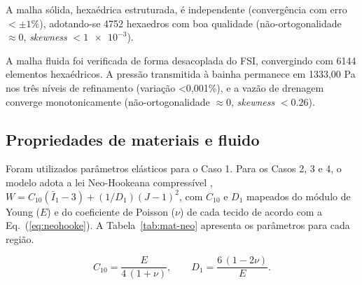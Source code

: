 \documentclass[article, hidelinks,oneside,12pt]{abntex2}
\begin{document}
A malha sólida, hexaédrica estruturada, é independente (convergência com erro $< \pm 1\%$), adotando-se \num{4752} hexaedros com boa qualidade (não-ortogonalidade $\approx 0$, \emph{skewness} $< \num{1e-3}$).

A malha fluida foi verificada de forma desacoplada do FSI, convergindo com 6144 elementos hexaédricos. A pressão transmitida à bainha permanece em 1333,00 Pa nos três níveis de refinamento (variação <0,001\%), e a vazão de drenagem converge monotonicamente (não-ortogonalidade $\approx 0$, \emph{skewness} $< \num{0,26}$).



\subsection*{Propriedades de materiais e fluido}
\label{sec:met-materiais}

Foram utilizados parâmetros elásticos para o Caso 1. Para os Casos 2, 3 e 4, o modelo adota a lei Neo-Hookeana compressível \cite{bonet2008, holzapfel2000}, $W = C_{10}(\bar I_1 - 3) + (1/D_1)(J-1)^2$, com $C_{10}$ e $D_1$ mapeados do módulo de Young ($E$) e do coeficiente de Poisson ($\nu$) de cada tecido de acordo com a Eq.~(\ref{eq:neohooke}). A Tabela~\ref{tab:mat-neo} apresenta os parâmetros para cada região.

\begin{equation}
  C_{10} = \frac{E}{4\,(1+\nu)}, \qquad
  D_1 = \frac{6\,(1-2\nu)}{E}.
  \label{eq:neohooke}
\end{equation}
\end{document}
